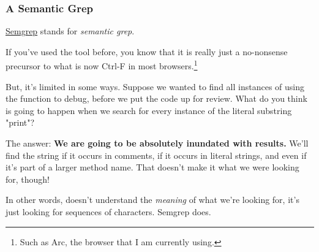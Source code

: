 \documentclass[aspectratio=169, handout]{beamer}
\begin{document}
\begin{frame}[fragile]
  \frametitle{A Semantic Grep}

  {\color{blue}\href{https://semgrep.dev/}{Semgrep}} stands for \textit{semantic grep}.

  \pause
  \vspace{\fill}

  If you've used the tool  before, you know that it is really just a
  no-nonsense precursor to what is now Ctrl-F in most browsers.\footnote{Such as Arc,
  the browser that I am currently using.}

  \pause
  \vspace{\fill}

  But, it's limited in some ways. Suppose we wanted to find all instances of
  using the function  to debug, before we put the code up for
  review. What do you think is going to happen when we search for every instance
  of the literal substring "print"?

  \pause
  \vspace{\fill}

  The answer: \textbf{We are going to be absolutely inundated with results.} We'll
  find the string  if it occurs in comments, if it occurs in literal
  strings, and even if it's part of a larger method name. That doesn't make it what
  we were looking for, though!

  \pause
  \vspace{\fill}

  In other words,  doesn't understand the \textit{meaning} of what we're
  looking for, it's just looking for sequences of characters. Semgrep does.
\end{frame}
\end{document}
